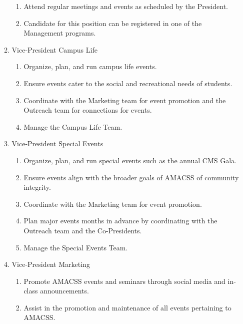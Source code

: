 \documentclass[12pt,a4paper]{article}
\begin{document}
\begin{enumerate}
\begin{enumerate}
\begin{enumerate}
\item Attend regular meetings and events as scheduled by the President.

\item Candidate for this position can be registered in one of the Management programs.
\end{enumerate}

\item Vice-President Campus Life

\begin{enumerate}
\item Organize, plan, and run campus life events.

\item Ensure events cater to the social and recreational needs of students.

\item Coordinate with the Marketing team for event promotion and the Outreach team for connections for events.

\item Manage the Campus Life Team.
\end{enumerate}

\item Vice-President Special Events

\begin{enumerate}
\item Organize, plan, and run special events such as the annual CMS Gala. 

\item Ensure events align with the broader goals of AMACSS of community integrity.

\item Coordinate with the Marketing team for event promotion.

\item Plan major events months in advance by coordinating with the Outreach team and the Co-Presidents.

\item Manage the Special Events Team.
\end{enumerate}

\item Vice-President Marketing

\begin{enumerate}
\item Promote AMACSS events and seminars through social media and in-class announcements.

\item Assist in the promotion and maintenance of all events pertaining to AMACSS.


\end{enumerate}
\end{enumerate}
\end{enumerate}
\end{document}
